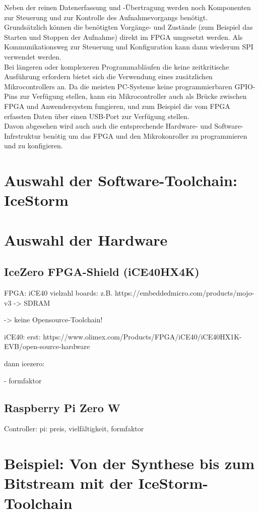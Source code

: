 Neben der reinen Datenerfassung und -Übertragung werden noch Komponenten zur Steuerung und zur Kontrolle des Aufnahmevorgangs benötigt.\\
Grundsätzlich können die benötigten Vorgänge- und Zustände (zum Beispiel das Starten und Stoppen der Aufnahme) direkt im FPGA umgesetzt werden. Als Kommunikationsweg zur Steuerung und Konfiguration kann dann wiederum SPI verwendet werden.\\
Bei längeren oder komplexeren Programmabläufen die keine zeitkritische Ausführung erfordern bietet sich die Verwendung eines zusätzlichen Mikrocontrollers an. Da die meisten PC-Systeme keine programmierbaren \acrshort{GPIO}-Pins zur Verfügung stellen, kann ein Mikrocontroller auch als Brücke zwischen FPGA und Anwendersystem fungieren, und zum Beispiel die vom FPGA erfassten Daten über einen USB-Port zur Verfügung stellen.\\
Davon abgesehen wird auch auch die entsprechende Hardware- und Software-Infrstruktur benötig um das FPGA und den Mikrokonroller zu programmieren und zu konfigieren.
\clearpage

\section{Auswahl der Software-Toolchain: IceStorm}
\clearpage

\section{Auswahl der Hardware}

\subsection{IceZero FPGA-Shield (iCE40HX4K)}
FPGA: iCE40
vielzahl boards:
	z.B. https://embeddedmicro.com/products/mojo-v3
	-> SDRAM

	-> keine Opensource-Toolchain!

iCE40:
	erst:
	https://www.olimex.com/Products/FPGA/iCE40/iCE40HX1K-EVB/open-source-hardware

	dann icezero:

	- formfaktor


\subsection{Raspberry Pi Zero W}

Controller:
	pi: preis, vielfältigkeit, formfaktor

\clearpage

\section{Beispiel: Von der Synthese bis zum Bitstream mit der IceStorm-Toolchain}
\clearpage


